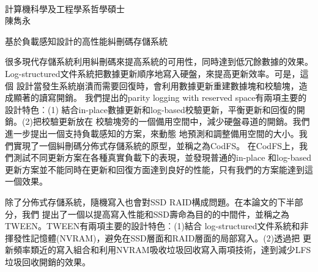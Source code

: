 \\
計算機科學及工程學系哲學碩士\\
陳雋永

\noindent 基於負載感知設計的高性能糾刪碼存儲系統

\vspace{1cm}

很多現代存儲系統利用糾刪碼來提高系統的可用性，同時達到低冗餘數據的效果。
Log-structured文件系統把數據更新順序地寫入硬盤，來提高更新效率。可是，這個
設計當發生系統崩潰而需要回復時，會利用數據更新重建數據塊和校驗塊，造成顯著的讀寫開銷。
我們提出的parity logging with reserved space有兩項主要的設計特色︰(1)
結合in-place數據更新和log-based校驗更新，平衡更新和回復的開銷。(2)把校驗更新放在
校驗塊旁的一個備用空間中，減少硬盤尋道的開銷。我們進一步提出一個支持負載感知的方案，來動態
地預測和調整備用空間的大小。我們實現了一個糾刪碼分佈式存儲系統的原型，並稱之為CodFS。
在CodFS上，我們測試不同更新方案在各種真實負載下的表現，並發現普通的in-place
和log-based更新方案並不能同時在更新和回復方面達到良好的性能，只有我們的方案能達到這一個效果。

除了分佈式存儲系統，隨機寫入也會對SSD RAID構成問題。在本論文的下半部分，我們
提出了一個以提高寫入性能和SSD壽命為目的的中間件，並稱之為TWEEN。TWEEN有兩項主要的設計特色︰(1)結合
log-structured文件系統和非揮發性記憶體(NVRAM)，避免在SSD層面和RAID層面的局部寫入。(2)透過把
更新頻率類近的寫入組合和利用NVRAM吸收垃圾回收寫入兩項技術，達到減少LFS垃圾回收開銷的效果。

